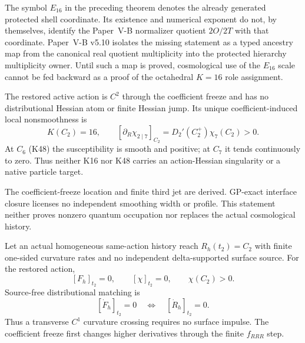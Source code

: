\documentclass[12pt,a4paper]{article}
\begin{document}
\begin{remark}
\label{p8:rem:e16-no-octahedral-backselection}
The symbol \(E_{16}\) in the preceding theorem denotes the already generated
protected shell coordinate.  Its existence and numerical exponent do not, by
themselves, identify the Paper~V-B normalizer quotient \(2O/2T\) with that
coordinate.  Paper~V-B v5.10 isolates the missing statement as a typed ancestry
map from the canonical real quotient multiplicity into the protected hierarchy
multiplicity owner.  Until such a map is proved, cosmological use of the
\(E_{16}\) scale cannot be fed backward as a proof of the octahedral
\(K=16\) role assignment.
\end{remark}

\begin{corollary}
\label{p8:cor:unique-k16-action-junction}
The restored active action is $C^2$ through the coefficient freeze and has no
distributional Hessian atom or finite Hessian jump.  Its unique
coefficient-induced local nonsmoothness is
\begin{equation}
\label{p8:eq:unique-k16-action-junction}
 \boxed{K(C_2)=16,\qquad
 [\partial_R\chi_{2\mid7}]_{C_2}
 =D_2'(C_2^+)\chi_7(C_2)>0.}
\end{equation}
At $C_6$ (K48) the susceptibility is smooth and positive; at $C_7$ it tends
continuously to zero.  Thus neither K16 nor K48 carries an action-Hessian
singularity or a native particle target.
\end{corollary}

\begin{remark}
The coefficient-freeze location and finite third jet are derived.  GP-exact
interface closure licenses no independent smoothing width or profile.  This
statement neither proves nonzero quantum occupation nor replaces the actual
cosmological history.
\end{remark}

\begin{theorem}
\label{p8:thm:k16-physical-time-junction-pullback}
Let an actual homogeneous same-action history reach $R_h(t_2)=C_2$ with
finite one-sided curvature rates and no independent delta-supported surface
source.  For the restored action,
\[
 [F_h]_{t_2}=0,\qquad [\chi]_{t_2}=0,\qquad \chi(C_2)>0.
\]
Source-free distributional matching is
\begin{equation}
\label{p8:eq:k16-source-free-history-junction}
 \boxed{[\dot F_h]_{t_2}=0
 \quad\Longleftrightarrow\quad [\dot R_h]_{t_2}=0.}
\end{equation}
Thus a transverse $C^1$ curvature crossing requires no surface impulse.  The
coefficient freeze first changes higher derivatives through the finite
$f_{RRR}$ step.
\end{theorem}
\end{document}
